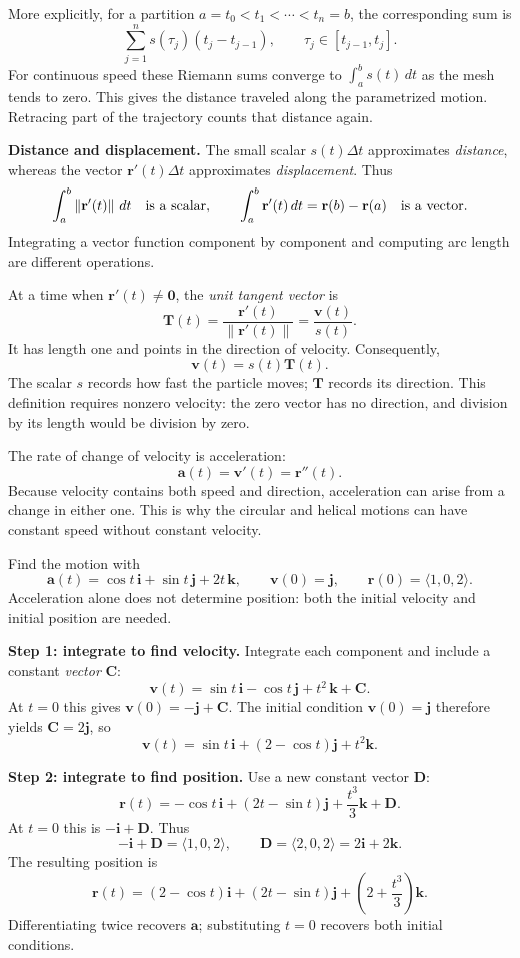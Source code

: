 \documentclass[11pt,letterpaper]{article}
\newcommand{\R}{\mathbf r}
\newcommand{\V}{\mathbf v}
\newcommand{\A}{\mathbf a}
\newcommand{\T}{\mathbf T}
\newcommand{\ii}{\mathbf i}
\newcommand{\jj}{\mathbf j}
\newcommand{\kk}{\mathbf k}
\newcommand{\norm}[1]{\left\lVert#1\right\rVert}
\newcommand{\heading}[1]{\vspace{5pt}{\large\bfseries #1}\par}
\newcommand{\subhead}[1]{\textbf{#1}\quad}
\begin{document}
More explicitly, for a partition $a=t_0<t_1<\cdots<t_n=b$, the corresponding sum is
\[
 \sum_{j=1}^n s(\tau_j)(t_j-t_{j-1}),
 \qquad \tau_j\in[t_{j-1},t_j].
\]
For continuous speed these Riemann sums converge to $\int_a^b s(t)\,dt$ as the mesh tends to zero. This gives the distance traveled along the parametrized motion. Retracing part of the trajectory counts that distance again.

\subhead{Distance and displacement.} The small scalar $s(t)\Delta t$ approximates \emph{distance}, whereas the vector $\R'(t)\Delta t$ approximates \emph{displacement}. Thus
\[
 \int_a^b\norm{\R'(t)}\,dt\quad\hbox{is a scalar},
 \qquad
 \int_a^b\R'(t)\,dt=\R(b)-\R(a)\quad\hbox{is a vector}.
\]
Integrating a vector function component by component and computing arc length are different operations.

\heading{Separating speed from direction}
At a time when $\R'(t)\ne\mathbf0$, the \emph{unit tangent vector} is
\[
 \boxed{\T(t)=\frac{\R'(t)}{\norm{\R'(t)}}=\frac{\V(t)}{s(t)}.}
\]
It has length one and points in the direction of velocity. Consequently,
\[
 \boxed{\V(t)=s(t)\T(t).}
\]
The scalar $s$ records how fast the particle moves; $\T$ records its direction. This definition requires nonzero velocity: the zero vector has no direction, and division by its length would be division by zero.

\heading{Acceleration}
The rate of change of velocity is acceleration:
\[
 \boxed{\A(t)=\V'(t)=\R''(t).}
\]
Because velocity contains both speed and direction, acceleration can arise from a change in either one. This is why the circular and helical motions can have constant speed without constant velocity.

\newpage
\heading{Recovering position from acceleration}
Find the motion with
\[
 \A(t)=\cos t\,\ii+\sin t\,\jj+2t\,\kk,
 \qquad \V(0)=\jj,
 \qquad\R(0)=\langle1,0,2\rangle.
\]
Acceleration alone does not determine position: both the initial velocity and initial position are needed.

\subhead{Step 1: integrate to find velocity.} Integrate each component and include a constant \emph{vector} $\mathbf C$:
\[
 \V(t)=\sin t\,\ii-\cos t\,\jj+t^2\,\kk+\mathbf C.
\]
At $t=0$ this gives $\V(0)=-\jj+\mathbf C$. The initial condition $\V(0)=\jj$ therefore yields $\mathbf C=2\jj$, so
\[
 \boxed{\V(t)=\sin t\,\ii+(2-\cos t)\jj+t^2\kk.}
\]

\subhead{Step 2: integrate to find position.} Use a new constant vector $\mathbf D$:
\[
 \R(t)=-\cos t\,\ii+(2t-\sin t)\jj+\frac{t^3}{3}\kk+\mathbf D.
\]
At $t=0$ this is $-\ii+\mathbf D$. Thus
\[
 -\ii+\mathbf D=\langle1,0,2\rangle,
 \qquad \mathbf D=\langle2,0,2\rangle=2\ii+2\kk.
\]
The resulting position is
\[
 \boxed{\R(t)=(2-\cos t)\ii+(2t-\sin t)\jj+
             \left(2+\frac{t^3}{3}\right)\kk.}
\]
Differentiating twice recovers $\A$; substituting $t=0$ recovers both initial conditions.
\end{document}
